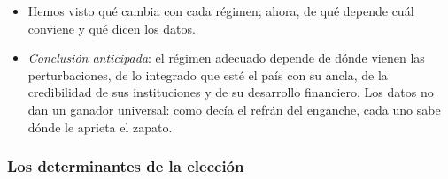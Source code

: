 \documentclass[11pt]{article}
\begin{document}
\begin{itemize}
\item Hemos visto qué cambia con cada régimen; ahora, de qué depende cuál conviene y qué dicen los datos.
\item \emph{Conclusión anticipada}: el régimen adecuado depende de dónde vienen las perturbaciones, de lo integrado que esté el país con su ancla, de la credibilidad de sus instituciones y de su desarrollo financiero. Los datos no dan un ganador universal: como decía el refrán del enganche, cada uno sabe dónde le aprieta el zapato.
\end{itemize}

\subsubsection{Los determinantes de la elección}\label{sec:determinantes}
\end{document}
